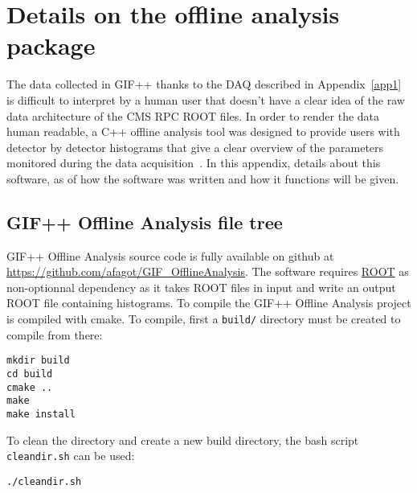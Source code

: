 
\graphicspath{{chapt_dutch/}{intro/}{chapt2/}{chapt3/}{chapt4/}{chapt5/}{chapt6/}{chapt7/}}

\renewcommand\evenpagerightmark{{\scshape\small Appendix B}}
\renewcommand\oddpageleftmark{{\scshape\small Details on the online analysis package}}

\renewcommand{\bibname}{References}

\hyphenation{}

\chapter[Details on the offline analysis package]%
{Details on the offline analysis package}
\label{app2}

The data collected in GIF++ thanks to the DAQ described in Appendix~\ref{app1} is difficult to interpret by a human user that doesn't have a clear idea of the raw data architecture of the CMS RPC ROOT files. In order to render the data human readable, a C++ offline analysis tool was designed to provide users with detector by detector histograms that give a clear overview of the parameters monitored during the data acquisition~\cite{GIFOffline}. In this appendix, details about this software, as of how the software was written and how it functions will be given.

\section{GIF++ Offline Analysis file tree}
\label{app2:sec:code}

	GIF++ Offline Analysis source code is fully available on github at \url{https://github.com/afagot/GIF_OfflineAnalysis}. The software requires \href{https://root.cern.ch/downloading-root}{ROOT} as non-optionnal dependency as it takes ROOT files in input and write an output ROOT file containing histograms. To compile the GIF++ Offline Analysis project is compiled with cmake. To compile, first a \verb+build/+ directory must be created to compile from there:

	\begin{verbatim}
mkdir build
cd build
cmake ..
make
make install
	\end{verbatim}
	
	To clean the directory and create a new build directory, the bash script \verb+cleandir.sh+ can be used:
	
	\begin{verbatim}
./cleandir.sh
	\end{verbatim}

